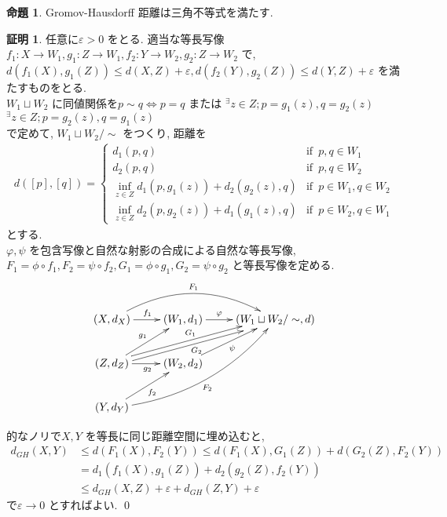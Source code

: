 \documentclass[10pt, fleqn, label-section=none, titlepage]{bxjsarticle}
\theoremstyle{definition}
\newtheorem{prop}[dfn]{命題}
\newtheorem*{pf*}{証明}
\newcommand{\veps}{\varepsilon}
\newcommand{\LR}{\Leftrightarrow}
\begin{document}
\begin{prop}
Gromov-Hausdorff 距離は三角不等式を満たす.
\end{prop}
\begin{pf*}
任意に$\veps > 0$ をとる. 
適当な等長写像$f_1 :X\rightarrow W_1, g_1 :Z \rightarrow W_1 , f_2 :Y\rightarrow W_2, g_2 :Z \rightarrow W_2$ で, \\
$d(f_1(X), g_1(Z)) \leq d(X,Z) + \veps, d(f_2(Y), g_2(Z)) \leq d(Y,Z) + \veps$ を満たすものをとる. \\
$W_1 \sqcup W_2$ に同値関係を$p \sim q \LR p=q$ または $^\exists z \in Z; p = g_1(z), q = g_2(z)$ $^\exists z \in Z; p = g_2(z), q = g_1(z)$ \\
で定めて, $W_1 \sqcup W_2 / \sim$ をつくり, 距離を
\begin{align*}
d([p], [q]) = 
\begin{cases}
d_1 (p,q) & \textrm{if}\,\,\, p,q \in W_1 \\
d_2 (p,q) & \textrm{if}\,\,\, p,q \in W_2 \\
\inf_{z \in Z} d_1 (p, g_1(z)) + d_2 (g_2(z), q) & \textrm{if}\,\,\, p \in W_1, q \in W_2\\
\inf_{z \in Z} d_2 (p, g_2(z)) + d_1 (g_1(z), q) & \textrm{if}\,\,\, p \in W_2, q \in W_1 
\end{cases}
\end{align*}
とする. \\
$\varphi, \psi$ を包含写像と自然な射影の合成による自然な等長写像, \\
$F_1 = \phi \circ f_1, F_2 = \psi \circ f_2,G_1 = \phi \circ g_1, G_2 = \psi \circ g_2$ と等長写像を定める.
\begin{align*}
\xymatrix{
(X, d_X) \ar[r]^{f_1} \ar@/^24pt/[rr]^{F_1} & (W_1 ,d_1) \ar[r]^{\hspace{-18pt} \varphi} & (W_1\sqcup W_2 / \sim ,d )\\
(Z, d_Z)  \ar[ur]^{g_1} \ar[r]_{g_2}  \ar@<0.5ex>[urr]^{G_1} \ar@<-0.5ex>[urr]_{G_2}& (W_2, d_2) \ar[ur]_{\psi}& \\
(Y, d_Y) \ar@/_18pt/[uurr]_{F_2} \ar[ur]_{f_2}& & 
}
\end{align*}

的なノリで$X,Y$ を等長に同じ距離空間に埋め込むと, \\
\begin{align*}
d_{GH}(X,Y) & \leq d(F_1(X), F_2(Y)) \leq d(F_1(X), G_1(Z)) + d(G_2(Z), F_2(Y)) \\
&= d_1 (f_1(X), g_1(Z)) + d_2 (g_2(Z), f_2(Y)) \\
&\leq d_{GH}(X,Z) + \veps + d_{GH}(Z,Y) + \veps
\end{align*}
で$\veps \rightarrow 0$ とすればよい.
\qed
\end{pf*}
\end{document}
